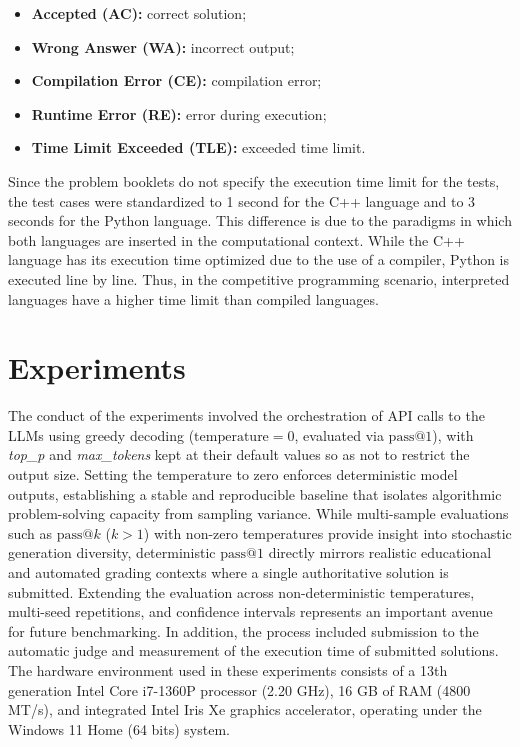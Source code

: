 \documentclass[conference]{IEEEtran}
\begin{document}
\begin{itemize}
    \item \textbf{Accepted (AC):} correct solution;
    \item \textbf{Wrong Answer (WA):} incorrect output;
    \item \textbf{Compilation Error (CE):} compilation error;
    \item \textbf{Runtime Error (RE):} error during execution;
    \item \textbf{Time Limit Exceeded (TLE):} exceeded time limit.
\end{itemize}

Since the problem booklets do not specify the execution time limit for the tests, the test cases were standardized to 1 second for the C++ language and to 3 seconds for the Python language. This difference is due to the paradigms in which both languages are inserted in the computational context. While the C++ language has its execution time optimized due to the use of a compiler, Python is executed line by line. Thus, in the competitive programming scenario, interpreted languages have a higher time limit than compiled languages.

\section{Experiments}\label{sec:experiments}

The conduct of the experiments involved the orchestration of API calls to the LLMs using greedy decoding ($\text{temperature} = 0$, evaluated via $\text{pass}@1$), with \textit{top\_p} and \textit{max\_tokens} kept at their default values so as not to restrict the output size. Setting the temperature to zero enforces deterministic model outputs, establishing a stable and reproducible baseline that isolates algorithmic problem-solving capacity from sampling variance. While multi-sample evaluations such as $\text{pass}@k$ ($k > 1$) with non-zero temperatures provide insight into stochastic generation diversity, deterministic $\text{pass}@1$ directly mirrors realistic educational and automated grading contexts where a single authoritative solution is submitted. Extending the evaluation across non-deterministic temperatures, multi-seed repetitions, and confidence intervals represents an important avenue for future benchmarking. In addition, the process included submission to the automatic judge and measurement of the execution time of submitted solutions. The hardware environment used in these experiments consists of a 13th generation Intel Core i7-1360P processor (2.20 GHz), 16 GB of RAM (4800 MT/s), and integrated Intel Iris Xe graphics accelerator, operating under the Windows 11 Home (64 bits) system.
\end{document}
